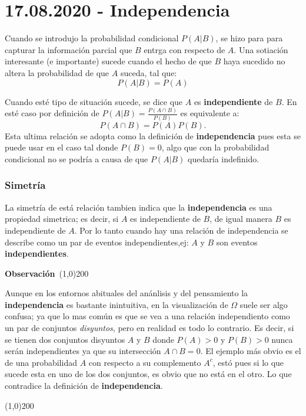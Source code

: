 \documentclass[a4paper,dvipsnames]{book}
\newenvironment{obs}
    {
        \begin{flushleft}
       \textbf{Observación}\
        \line(1,0){200} \
        \end{flushleft}
    }
    {
        \begin{flushright}
        \line(1,0){200}
        \end{flushright}
    }
\begin{document}
\section{17.08.2020 - Independencia}
\label{sec:independencia}

Cuando se introdujo la probabilidad condicional \(P\left(A|B\right)\), se hizo
para para capturar la información parcial que \(B\) entrga con respecto de
\(A\). Una sotiación interesante (e importante) sucede cuando el hecho de que
\(B\) haya sucedido no altera la probabilidad de que \(A\) suceda, tal que:
\[P\left(A|B\right)=P\left(A\right)\]

Cuando esté tipo de situación sucede, se dice que {\color{MidnightBlue} \(A\)
es \textbf{independiente} de \(B\)}. En esté caso por definición de \(P\left(A|B\right)=\frac{P\left(A\cap B\right)}{P\left(B\right)}\) es equivalente a:
\[ P\left(A\cap B\right)=P\left(A\right)P\left(B\right) .\]
Esta ultima relación se adopta como la definición de \textbf{independencia}
pues esta se puede usar en el caso tal donde \(P\left(B\right)=0\), algo que
con la probabilidad condicional no se podría a causa de que
\(P\left(A|B\right)\) quedaría indefinido.

\subsubsection{Simetría}

La simetría de está relación tambien indica que la \textbf{independencia} es una propiedad simetrica; es decir, si \(A\) es independiente de \(B\), de igual manera \(B\) es independiente de \(A\). Por lo tanto cuando hay una relación de independencia se describe como un par de eventos independientes,ej: {\color{Salmon} \(A\) y \(B\) son eventos \textbf{independientes}}.

\begin{obs}
    Aunque en los entornos abituales del anánlisis y del pensamiento la
    \textbf{independencia} es bastante inintuitiva, en la visualización de
    \(\Omega \) suele ser algo confusa; ya que lo mas común es que se vea a una
    relación independiento como un par de conjuntos \textit{disyuntos}, pero en
    realidad es todo lo contrario. Es decir, si se tienen dos conjuntos
    disyuntos \(A\) y \(B\) donde \(P\left(A\right)>0 \text{ y
    }P\left(B\right)>0\) nunca serán independientes ya que su intersección
    \(A\cap B=0\). {\color{BrickRed} El ejemplo más obvio es el de una
    probabilidad \(A\) con respecto a su complemento \(A^{c}\), estó pues si lo
    que sucede esta en uno de los dos conjuntos, es obvio que no está en el otro}.
    Lo que contradice la definición de \textbf{independencia}.
\end{obs}
\end{document}
